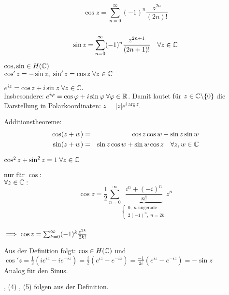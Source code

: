 \documentclass[a4paper,twoside,DIV15,BCOR12mm]{scrbook}
\begin{document}
\begin{satz} %
\begin{liste}
\item $$\cos z = \sum_{n=0}^{\infty}(-1)^n\frac{z^{2n}}{(2n)!}$$\\
$$\sin z = \sum_{n=0}^{\infty}(-1)^n\frac{z^{2n+1}}{(2n+1)!} \quad \forall z \in \mathbb{C}$$
\item $\cos , \sin \in H(\mathbb{C} )$\\
$\cos 'z = -\sin z,\; \sin 'z = \cos z \;\forall z \in \mathbb{C}$
\item $e^{iz} = \cos z + i\sin z \; \forall z \in \mathbb{C}.$ \\
Insbesondere: $e^{i\varphi} = \cos\varphi + i\sin\varphi \;\forall\varphi\in\mathbb{R}$. Damit lautet für $z \in \mathbb{C}\backslash\{0\}$ die Darstellung in Polarkoordinaten: $z = |z|e^{i\arg z}$.
\item Additionstheoreme:\begin{eqnarray}\notag\cos (z+w) &=& \cos z\cos w - \sin z\sin w \\
\notag \sin (z+w) &=& \sin z\cos w + \sin w\cos z \quad\forall z,w \in \mathbb{C} \end{eqnarray}
\item $\cos ^2z + \sin ^2z = 1 \;\forall z\in\mathbb{C}$
\end{liste}
\end{satz}







\begin{beweis}
\begin{liste}
\item nur für $\cos$: \\
$\forall z \in \mathbb{C} :$ 
$$\cos z = \frac{1}{2}\sum_{n=0}^{\infty}\underbrace{\frac{i^n + (-i)^n}{n!}}_{\begin{cases}0,\; n \text{ ungerade} \\ 2(-1)^n,\;n = 2k\end{cases}}z^n$$ \\
$\implies \cos z = \sum_{k=0}^{\infty}(-1)^k\frac{z^{2k}}{2k!}$
\item Aus der Definition folgt: $\cos \in H(\mathbb{C})$ und \\
$\cos 'z = \frac{1}{2}(ie^{iz} - ie^{-iz}) = \frac{i}{2}(e^{iz} - e^{-iz}) = \frac{-1}{2i}(e^{iz} - e^{-iz}) = -\sin z$ \\
Analog für den Sinus.
\item , (4) , (5) folgen aus der Definition.
\end{liste}
\end{beweis}
\end{document}
